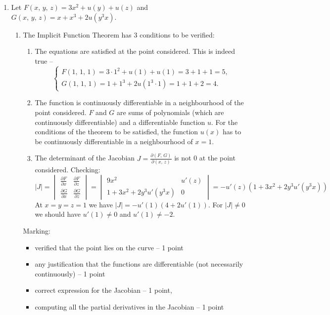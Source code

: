 \begin{enumerate}
    \item Let $F(x,\,y,\,z)=3x^2+u(y)+u(z)$ and $G(x,\,y,\,z)=x+x^3+2u(y^3x)$.
    \begin{enumerate}
        \item The Implicit Function Theorem has 3 conditions to be verified:
        \begin{enumerate}
            \item The equations are satisfied at the point considered. This is indeed true --
            \[
            \begin{cases}
                F(1,\,1,\,1)=3\cdot 1^2+u(1)+u(1)=3+1+1=5,\\
                G(1,\,1,\,1)=1+1^3+2u(1^3\cdot1)=1+1+2=4.
            \end{cases}
            \]
            \item The function is continuously differentiable in a neighbourhood of the point considered. $F$ and $G$ are sums of polynomials (which are continuously differentiable) and a differentiable function $u$. For the conditions of the theorem to be satisfied, the function $u(x)$ has to be continuously differentiable in a neighbourhood of $x=1$.
            \item The determinant of the Jacobian $J=\frac{\partial(F,\,G)}{\partial(x,\,z)}$ is not 0 at the point considered. Checking:
            \[
            |J|=\begin{vmatrix}\frac{\partial F}{\partial x}& \frac{\partial F}{\partial z}\\
            \frac{\partial G}{\partial x}& \frac{\partial G}{\partial z}\end{vmatrix}=
            \begin{vmatrix}9x^2&u'(z)\\1+3x^2+2y^3u'(y^3x)&0\end{vmatrix}=-u'(z)(1+3x^2+2y^3u'(y^3x))
            \]
            At $x=y=z=1$ we have $|J|=-u'(1)(4+2u'(1))$. For $|J|\neq 0$ we should have $u'(1)\neq 0$ and $u'(1)\neq -2$.
            \end{enumerate}
        Marking:
        \begin{itemize}
        \item verified that the point lies on the curve -- 1 point
        \item any justification that the functions are differentiable (not necessarily continuously) -- 1 point
        \item correct expression for the Jacobian -- 1 point,
        \item computing all the partial derivatives in the Jacobian -- 1 point

\end{itemize}
\end{enumerate}
\end{enumerate}
